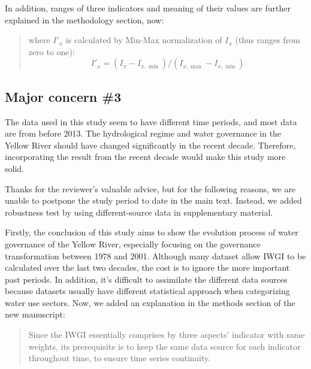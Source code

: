 \AR*{} In addition, ranges of three indicators and meaning of their values are further explained in the methodology section, now:

\begin{quote}
	where $I'_x$ is calculated by Min-Max normalization of $I_x$ (thus ranges from zero to one):
	\begin{equation}
		I'_x = (I_x - I_{x, \min}) / (I_{x, \max} - I_{x, \min})
	\end{equation}
\end{quote}

\subsection{Major concern \#3}
\RC{} The data used in this study seem to have different time periods, and most data are from before 2013. The hydrological regime and water governance in the Yellow River should have changed significantly in the recent decade. Therefore, incorporating the result from the recent decade would make this study more solid.

\AR{} Thanks for the reviewer's valuable advice, but for the following reasons, we are unable to postpone the study period to date in the main text. Instead, we added robustness test by using different-source data in supplementary material.

\AR*{} Firstly, the conclusion of this study aims to show the evolution process of water governance of the Yellow River, especially focusing on the governance transformation between 1978 and 2001. Although many dataset allow IWGI to be calculated over the last two decades, the cost is to ignore the more important past periods. In addition, it's difficult to assimilate the different data sources because datasets usually have different statistical approach when categorizing water use sectors. Now, we added an explanation in the methods section of the new manuscript:

\begin{quote}
	Since the IWGI essentially comprises by three aspects' indicator with same weights, its prerequisite is to keep the same data source for each indicator throughout time, to ensure time series continuity.
\end{quote}

